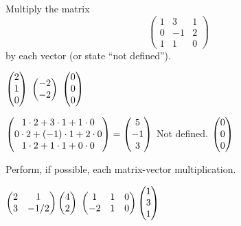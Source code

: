 \begin{exercises}
  \recommended \item  
    Multiply the matrix
    \begin{equation*}
      \begin{pmatrix}
        1  &3  &1  \\
        0  &-1 &2  \\
        1  &1  &0
      \end{pmatrix}
    \end{equation*}
    by each vector (or state ``not defined'').
    \begin{exparts*}
      \partsitem \( \begin{pmatrix} 2 \\ 1 \\ 0 \end{pmatrix} \)
      \partsitem \( \begin{pmatrix} -2 \\ -2 \end{pmatrix} \)
      \partsitem \( \begin{pmatrix} 0 \\ 0 \\ 0 \end{pmatrix} \)
    \end{exparts*}
    \begin{answer}
      \begin{exparts*}
        \partsitem \(
           \begin{pmatrix} 1\cdot 2+3\cdot 1+1\cdot 0         \\
                        0\cdot 2+(-1)\cdot 1+2\cdot 0 \\
                        1\cdot 2+1\cdot 1+0\cdot 0 \end{pmatrix}
           =\begin{pmatrix} 5 \\ -1 \\ 3 \end{pmatrix}   \)
        \partsitem Not defined.
        \partsitem \(  \begin{pmatrix} 0 \\ 0 \\ 0 \end{pmatrix}  \)
      \end{exparts*}  
    \end{answer}
  \item 
    Perform, if possible, each matrix-vector multiplication.
    \begin{exparts*}
      \partsitem $\begin{pmatrix}
                    2  &1  \\
                    3  &-1/2
                  \end{pmatrix}
                  \begin{pmatrix} 4  \\ 2 \end{pmatrix}$
      \partsitem $\begin{pmatrix}
                    1  &1  &0 \\
                    -2 &1  &0
                  \end{pmatrix}
                  \begin{pmatrix} 1 \\ 3 \\ 1 \end{pmatrix}$

\end{exparts*}
\end{exercises}
